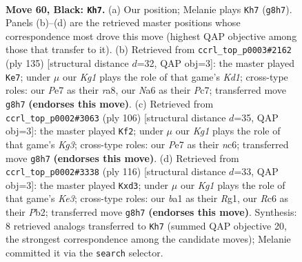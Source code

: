 \documentclass[11pt]{article}
\begin{document}
\clearpage

\begin{figure}[p]\centering
\begin{subfigure}{0.46\textwidth}\centering
\resizebox{\linewidth}{!}{%
\newchessgame
\chessboard[
  setfen={6k1/4p3/npr5/pN4p1/P1p5/2P3K1/3R4/B7 b - - 1 60},
  showmover=false,
  pgfstyle=straightmove, color=movearrow, markmove={g8-h7}
]}
\caption{}
\end{subfigure}\hfill
\begin{subfigure}{0.46\textwidth}\centering
\resizebox{\linewidth}{!}{%
\newchessgame
\chessboard[
  setfen={R2k4/2p5/5rp1/2N1p2p/1Pb1P2P/6P1/1K6/8 b - - 15 68},
  showmover=false,
  pgfstyle=straightmove, color=movearrow, markmove={d8-e7}
]}
\caption{}
\end{subfigure}
\\[4pt]
\begin{subfigure}{0.46\textwidth}\centering
\resizebox{\linewidth}{!}{%
\newchessgame
\chessboard[
  setfen={8/6k1/2n3p1/6Pp/2N1R2P/1p4K1/1P6/3r4 w - - 9 54},
  showmover=false,
  pgfstyle=straightmove, color=movearrow, markmove={g3-f2}
]}
\caption{}
\end{subfigure}\hfill
\begin{subfigure}{0.46\textwidth}\centering
\resizebox{\linewidth}{!}{%
\newchessgame
\chessboard[
  setfen={6r1/1p1k4/4p3/p3P1n1/6PN/1P1pK3/1P6/6R1 w - - 3 59},
  showmover=false,
  pgfstyle=straightmove, color=movearrow, markmove={e3-d3}
]}
\caption{}
\end{subfigure}
\caption{\textbf{Move 60, Black: \texttt{Kh7}.} (a) Our position; Melanie plays \texttt{Kh7} (\texttt{g8h7}). Panels (b)--(d) are the retrieved master positions whose correspondence most drove this move (highest QAP objective among those that transfer to it). (b) Retrieved from \texttt{ccrl\_top\_p0003\#2162} (ply 135) [structural distance $d$=32, QAP obj=3]: the master played \texttt{Ke7}; under $\mu$ our \emph{Kg1} plays the role of that game's \emph{Kd1}; cross-type roles: our \emph{P}e7 as their \emph{r}a8, our \emph{N}a6 as their \emph{P}c7; transferred move \texttt{g8h7} \textbf{(endorses this move)}. (c) Retrieved from \texttt{ccrl\_top\_p0002\#3063} (ply 106) [structural distance $d$=35, QAP obj=3]: the master played \texttt{Kf2}; under $\mu$ our \emph{Kg1} plays the role of that game's \emph{Kg3}; cross-type roles: our \emph{P}e7 as their \emph{n}c6; transferred move \texttt{g8h7} \textbf{(endorses this move)}. (d) Retrieved from \texttt{ccrl\_top\_p0002\#3338} (ply 116) [structural distance $d$=33, QAP obj=3]: the master played \texttt{Kxd3}; under $\mu$ our \emph{Kg1} plays the role of that game's \emph{Ke3}; cross-type roles: our \emph{b}a1 as their \emph{R}g1, our \emph{R}c6 as their \emph{P}b2; transferred move \texttt{g8h7} \textbf{(endorses this move)}. Synthesis: 8 retrieved analogs transferred to \texttt{Kh7} (summed QAP objective 20, the strongest correspondence among the candidate moves); Melanie committed it via the \texttt{search} selector.}
\label{fig:thought-m119}
\end{figure}
\end{document}
